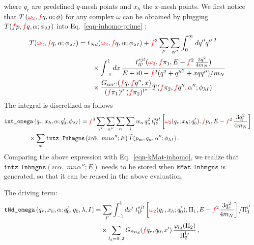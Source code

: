 \documentclass[11pt,aps]{revtex4}
\newcommand{\PF}{{\color{red}f}}
\newcommand{\cmplx}[1]{{\color{red} #1 }}
\begin{document}
where $q_r$ are predefined $q$-mesh points and $x_h$ the $x$-mesh points.
We first notice that $T\left(\cmplx{\omega_2}, \PF q, \alpha; \phi \right)$ for any complex $\omega$ can be obtained by plugging $T(\PF p, \PF q, \alpha; \phi_{\lambda I})$ into Eq.~\eqref{eqn-inhomo-prime} :
\begin{equation}
\begin{split}
  T(\cmplx{\omega_2}, \PF q, \alpha; \phi_{\lambda I}) &= t_{Nd}(\cmplx{\omega_2}, \PF q, \alpha; \phi_{\lambda I}) + \PF^3 \sum_{l'}\sum_{\alpha''} \int_0^\infty dq'' {q''\,}^2 \\
    & \qquad \times \int_{-1}^1{dx} \, \frac{t_{ll'}^{sjt} (\cmplx{\omega_2}, \PF \pi_1, E - \PF^2\, \frac{3q^2}{4m_N})}{E + i0 - \PF^2 (q^2 + {q''}^2 + x q q'')/m_N} \\
    & \qquad \times \frac{G_{\bar{\alpha}\alpha''}(\PF q, \PF q'', x)}{(\PF \pi_1)^{l'} \, (\PF \pi_2)^{l''}} T(\PF \pi_2, \PF q'', \alpha''; \phi_{\lambda I})
\end{split}
\end{equation}
The integral is discretized as follows
\begin{equation}
\begin{split}
  & \texttt{int\_omega}\left(q_r, x_h, \alpha; q_0', \phi_{\lambda I} \right) = \PF^3 \sum_{l'}\sum_{\alpha''} \sum_n \sum_i w_n\, {q}_n^2\, t_{ll'}^{sjt} \left[\cmplx{\omega_2}(q_r, x_h; q_0'), \PF p_i, E - \PF^2\, \frac{3q_r^2}{4m_N}\right] \\
  & \qquad \qquad \times  \sum_m \texttt{intz\_Inhmgns}\left(i r \bar{\alpha},\; m n \alpha''; E\right) \widetilde{T}(p_m, q_n, \alpha''; \phi_{\lambda I}) \, .
\end{split}
\end{equation}
Comparing the above expression with Eq.~\eqref{eqn-kMat-inhomo}, we realize that $\texttt{intz\_Inhmgns}\left(i r \bar{\alpha},\; m n \alpha''; E\right)$
needs to be stored when $\texttt{kMat\_Inhmgns}$ is generated, so that it can be reused in the above evaluation.

The driving term:
\begin{equation}
\begin{split}
  \texttt{tNd\_omega}\left(q_r, x_h, \alpha; q_0', q_0, \lambda, I \right) &= \sum_{l'} \int_{-1}^1 dx'\; t_{ll'}^{sjt} \left[\cmplx{\omega_2}(q_r, x_h; q_0'), \Pi_1, E - \PF^2 \frac{3q_r^2}{4m_N}\right]/\Pi_1^{l'} \\
    & \quad \times \sum_{l_d = 0\, , 2} G_{\bar{\alpha} \alpha_d} (\PF q_r, q_0, x')\, \frac{\varphi_{l_d}(\Pi_2)}{\Pi_2^{l_d}}\, ,
\end{split}
\end{equation}
\end{document}
